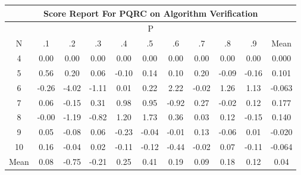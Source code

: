 \documentclass[11pt,a4paper]{report}
\begin{document}
\begin{longtable}{ | c || c | c | c | c | c | c | c | c | c || c |}
\hline
\multicolumn{11}{|c|}{ Score Report For PQRC on Algorithm Verification} \\
\hline
\multicolumn{11}{|c|}{ P } \\
\hline
N & .1 & .2 & .3 & .4 & .5 & .6 & .7 & .8 & .9 & Mean\\
 \hline
 \hline
 \endhead
  4 &  \cellcolor[HTML]{FFFFFF} 0.00 &  \cellcolor[HTML]{FFFFFF} 0.00 &  \cellcolor[HTML]{FFFFFF} 0.00 &  \cellcolor[HTML]{FFFFFF} 0.00 &  \cellcolor[HTML]{FFFFFF} 0.00 &  \cellcolor[HTML]{FFFFFF} 0.00 &  \cellcolor[HTML]{FFFFFF} 0.00 &  \cellcolor[HTML]{FFFFFF} 0.00 &  \cellcolor[HTML]{FFFFFF} 0.00 & 0.000 \\
  5 &  \cellcolor[HTML]{EFEFFF} 0.56 &  \cellcolor[HTML]{F7F7FF} 0.20 &  \cellcolor[HTML]{FFFFFF} 0.06 &  \cellcolor[HTML]{FFFFFF} -0.10 &  \cellcolor[HTML]{FFFFFF} 0.14 &  \cellcolor[HTML]{FFFFFF} 0.10 &  \cellcolor[HTML]{F7F7FF} 0.20 &  \cellcolor[HTML]{FFFFFF} -0.09 &  \cellcolor[HTML]{FFFFFF} -0.16 & 0.101 \\
  6 &  \cellcolor[HTML]{FFF7F7} -0.26 &  \cellcolor[HTML]{FF9797} -4.02 &  \cellcolor[HTML]{FFDFDF} -1.11 &  \cellcolor[HTML]{FFFFFF} 0.01 &  \cellcolor[HTML]{F7F7FF} 0.22 &  \cellcolor[HTML]{C7C7FF} 2.22 &  \cellcolor[HTML]{FFFFFF} -0.02 &  \cellcolor[HTML]{DFDFFF} 1.26 &  \cellcolor[HTML]{DFDFFF} 1.13 & -0.063 \\
  7 &  \cellcolor[HTML]{FFFFFF} 0.06 &  \cellcolor[HTML]{FFFFFF} -0.15 &  \cellcolor[HTML]{F7F7FF} 0.31 &  \cellcolor[HTML]{E7E7FF} 0.98 &  \cellcolor[HTML]{E7E7FF} 0.95 &  \cellcolor[HTML]{FFE7E7} -0.92 &  \cellcolor[HTML]{F7F7FF} 0.27 &  \cellcolor[HTML]{FFFFFF} -0.02 &  \cellcolor[HTML]{FFFFFF} 0.12 & 0.177 \\
  8 &  \cellcolor[HTML]{FFFFFF} -0.00 &  \cellcolor[HTML]{FFDFDF} -1.19 &  \cellcolor[HTML]{FFE7E7} -0.82 &  \cellcolor[HTML]{DFDFFF} 1.20 &  \cellcolor[HTML]{D7D7FF} 1.73 &  \cellcolor[HTML]{F7F7FF} 0.36 &  \cellcolor[HTML]{FFFFFF} 0.03 &  \cellcolor[HTML]{FFFFFF} 0.12 &  \cellcolor[HTML]{FFFFFF} -0.15 & 0.140 \\
  9 &  \cellcolor[HTML]{FFFFFF} 0.05 &  \cellcolor[HTML]{FFFFFF} -0.08 &  \cellcolor[HTML]{FFFFFF} 0.06 &  \cellcolor[HTML]{FFF7F7} -0.23 &  \cellcolor[HTML]{FFFFFF} -0.04 &  \cellcolor[HTML]{FFFFFF} -0.01 &  \cellcolor[HTML]{FFFFFF} 0.13 &  \cellcolor[HTML]{FFFFFF} -0.06 &  \cellcolor[HTML]{FFFFFF} 0.01 & -0.020 \\
  10 &  \cellcolor[HTML]{F7F7FF} 0.16 &  \cellcolor[HTML]{FFFFFF} -0.04 &  \cellcolor[HTML]{FFFFFF} 0.02 &  \cellcolor[HTML]{FFFFFF} -0.11 &  \cellcolor[HTML]{FFFFFF} -0.12 &  \cellcolor[HTML]{FFF7F7} -0.44 &  \cellcolor[HTML]{FFFFFF} -0.02 &  \cellcolor[HTML]{FFFFFF} 0.07 &  \cellcolor[HTML]{FFFFFF} -0.11 & -0.064 \\
 \hline
 \hline
Mean &  \cellcolor[HTML]{FFFFFF} 0.08 &  \cellcolor[HTML]{FFEFEF} -0.75 &  \cellcolor[HTML]{FFF7F7} -0.21 &  \cellcolor[HTML]{F7F7FF} 0.25 &  \cellcolor[HTML]{F7F7FF} 0.41 &  \cellcolor[HTML]{F7F7FF} 0.19 &  \cellcolor[HTML]{FFFFFF} 0.09 &  \cellcolor[HTML]{F7F7FF} 0.18 &  \cellcolor[HTML]{FFFFFF} 0.12 &  \cellcolor[HTML]{FFFFFF} 0.04
\end{longtable}
\end{document}
